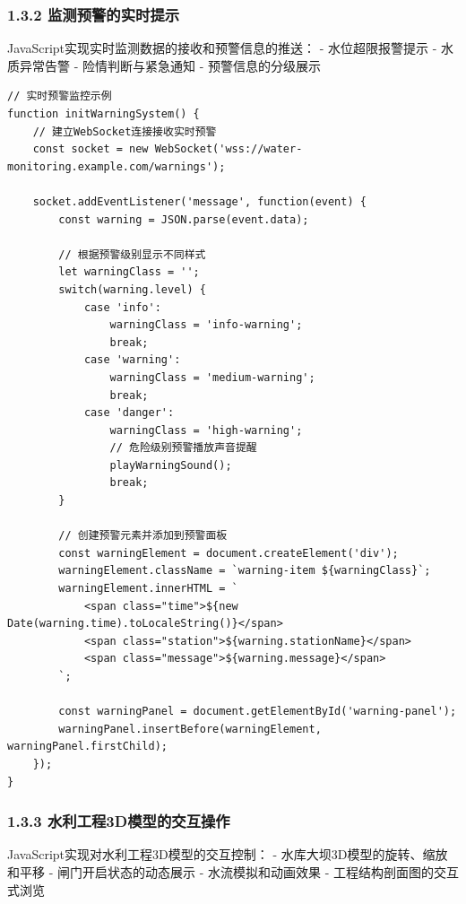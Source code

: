 \subsubsection{1.3.2
监测预警的实时提示}\label{ux76d1ux6d4bux9884ux8b66ux7684ux5b9eux65f6ux63d0ux793a}

JavaScript实现实时监测数据的接收和预警信息的推送： - 水位超限报警提示 -
水质异常告警 - 险情判断与紧急通知 - 预警信息的分级展示

\begin{lstlisting}
// 实时预警监控示例
function initWarningSystem() {
    // 建立WebSocket连接接收实时预警
    const socket = new WebSocket('wss://water-monitoring.example.com/warnings');
    
    socket.addEventListener('message', function(event) {
        const warning = JSON.parse(event.data);
        
        // 根据预警级别显示不同样式
        let warningClass = '';
        switch(warning.level) {
            case 'info':
                warningClass = 'info-warning';
                break;
            case 'warning':
                warningClass = 'medium-warning';
                break;
            case 'danger':
                warningClass = 'high-warning';
                // 危险级别预警播放声音提醒
                playWarningSound();
                break;
        }
        
        // 创建预警元素并添加到预警面板
        const warningElement = document.createElement('div');
        warningElement.className = `warning-item ${warningClass}`;
        warningElement.innerHTML = `
            <span class="time">${new Date(warning.time).toLocaleString()}</span>
            <span class="station">${warning.stationName}</span>
            <span class="message">${warning.message}</span>
        `;
        
        const warningPanel = document.getElementById('warning-panel');
        warningPanel.insertBefore(warningElement, warningPanel.firstChild);
    });
}
\end{lstlisting}

\subsubsection{1.3.3
水利工程3D模型的交互操作}\label{ux6c34ux5229ux5de5ux7a0b3dux6a21ux578bux7684ux4ea4ux4e92ux64cdux4f5c}

JavaScript实现对水利工程3D模型的交互控制： -
水库大坝3D模型的旋转、缩放和平移 - 闸门开启状态的动态展示 -
水流模拟和动画效果 - 工程结构剖面图的交互式浏览

